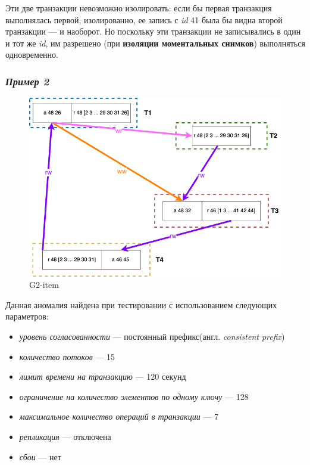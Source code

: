 \documentclass[12pt,  openany]{book}
\begin{document}
\par Эти две транзакции невозможно изолировать: если бы первая транзакция выполнялась первой, изолированно, ее запись с \textit{id} 41 была бы видна второй транзакции --- и наоборот. Но поскольку эти транзакции не записывались в один и тот же \textit{id}, им разрешено (при \textbf{изоляции моментальных снимков}) выполняться одновременно.

\subsubsection{\textit{Пример 2}}
\begin{figure}[H]
  \includegraphics[width=\textwidth]{images/g2item2.png}
  \caption{G2-item}
\end{figure}

\par Данная аномалия найдена при тестировании с использованием следующих параметров: 
\begin{itemize}
\item[] \textit{уровень согласованности} --- постоянный префикс(англ.  \textit{consistent prefix})
\item[] \textit{количество потоков} --- 15
\item[] \textit{лимит времени на транзакцию} --- 120 секунд
\item[] \textit{ограничение на количество элементов по одному ключу} --- 128
\item[] \textit{максимальное количество операций в транзакции} --- 7
\item[] \textit{репликация} --- отключена
\item[] \textit{сбои} --- нет
\end{itemize}
\end{document}
